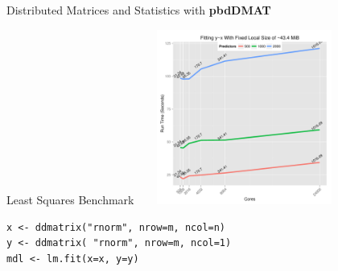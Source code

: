 \begin{frame}[fragile]
  \begin{block}{Distributed Matrices and Statistics with \textbf{pbdDMAT}}\pause
  \begin{center}
  \begin{minipage}{.9\textwidth}
  \centering\vspace{-.1cm}
	Least Squares Benchmark
		\includegraphics[width=7cm,height=5.75cm]{../common/pics/benchmarks/lmfit2}
  \end{minipage}
 \begin{minipage}{.9\textwidth}
 \centering\vspace{-.55cm}
\begin{lstlisting}[title=\ ,basicstyle=\scriptsize,numbers=none]
x <- ddmatrix("rnorm", nrow=m, ncol=n)
y <- ddmatrix( "rnorm", nrow=m, ncol=1)
mdl <- lm.fit(x=x, y=y)
\end{lstlisting}
 \end{minipage}
 \end{center}
  \end{block}
\end{frame}



